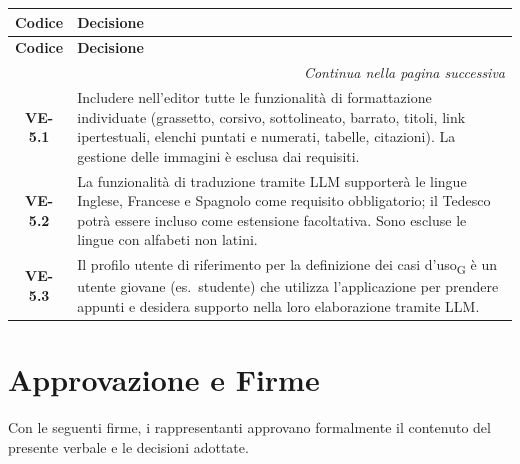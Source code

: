 \renewcommand{\arraystretch}{1.3}
\vspace{-0.3cm}
\noindent
\begin{longtable}{c p{12cm}}
	\toprule
	\textbf{Codice} & \textbf{Decisione} \\
	\midrule
	\endfirsthead

	\toprule
	\textbf{Codice} & \textbf{Decisione} \\
	\midrule
	\endhead

	\midrule
	\multicolumn{2}{r}{\textit{Continua nella pagina successiva}} \\
	\midrule
	\endfoot

	\bottomrule
	\endlastfoot

	\textbf{VE-5.1}
		& Includere nell'editor tutte le funzionalità di formattazione
		  individuate (grassetto, corsivo, sottolineato, barrato, titoli,
		  link ipertestuali, elenchi puntati e numerati, tabelle, citazioni).
		  La gestione delle immagini è esclusa dai requisiti. \\[4pt]

	\textbf{VE-5.2}
		& La funzionalità di traduzione tramite LLM supporterà le lingue
		  Inglese, Francese e Spagnolo come requisito obbligatorio; il
		  Tedesco potrà essere incluso come estensione facoltativa. Sono
		  escluse le lingue con alfabeti non latini. \\[4pt]

	\textbf{VE-5.3}
		& Il profilo utente di riferimento per la definizione dei casi
		  d'uso\textsubscript{G} è un utente giovane (es.\ studente) che
		  utilizza l'applicazione per prendere appunti e desidera supporto
		  nella loro elaborazione tramite LLM. \\

\end{longtable}

\newpage
\section*{Approvazione e Firme}
Con le seguenti firme, i rappresentanti approvano formalmente il contenuto
del presente verbale e le decisioni adottate.

\vspace{2.5cm}

